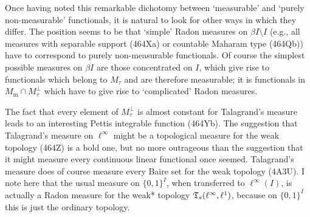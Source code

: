 {Once having noted this remarkable dichotomy between `measurable' and
`purely non-measurable' functionals, it is natural to look for other
ways in which they differ.   The position seems to be that `simple'
Radon measures on $\beta I\setminus I$ (e.g., all measures with
separable support (464Xa) or countable Maharam type (464Qb)) have to
correspond to purely non-measurable functionals.   Of course the
simplest possible measures on $\beta I$ are those concentrated on $I$,
which give rise to functionals which belong to $M_{\tau}$ and are
therefore measurable;  it is functionals in
$M_{\text{m}}\cap M_{\tau}^{\perp}$ which have to give rise to
`complicated' Radon measures.

The fact that every element of $M_{\tau}^{\perp}$ is almost constant for
Talagrand's measure leads to an interesting Pettis integrable function
(464Yb).
The suggestion that Talagrand's measure on $\ell^{\infty}$ might be a
topological measure for the weak topology (464Z) is a bold one, but no
more outrageous than the suggestion that it might measure every
continuous linear functional once seemed.   Talagrand's measure does of
course measure every Baire set for the weak topology (4A3U).
I note here that the usual measure on $\{0,1\}^I$, when transferred to
$\ell^{\infty}(I)$, is actually a Radon measure for the weak*
topology $\frak T_s(\ell^{\infty},\ell^1)$, because on $\{0,1\}^I$ this
is just the ordinary topology.
}%

\discrpage


